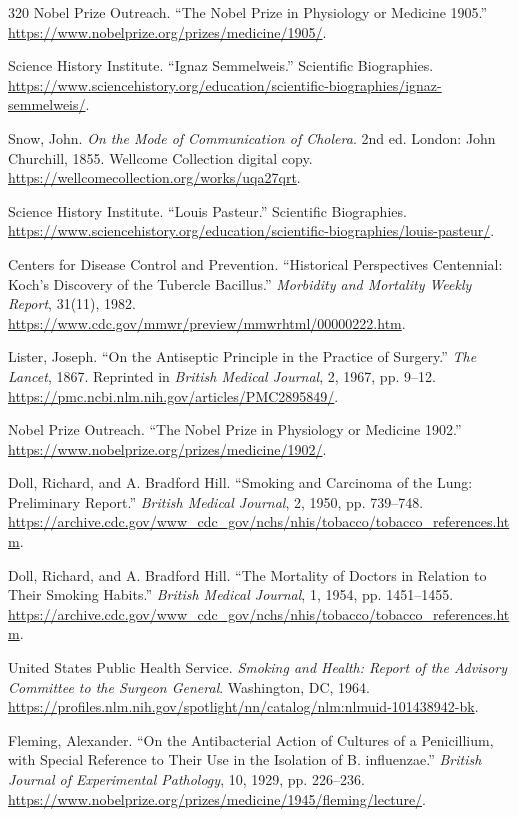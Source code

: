 \documentclass[12pt,oneside]{book}
\begin{document}
\begin{thebibliography}{320}
Nobel Prize Outreach. ``The Nobel Prize in Physiology or Medicine 1905.''
\url{https://www.nobelprize.org/prizes/medicine/1905/}.

Science History Institute. ``Ignaz Semmelweis.'' Scientific Biographies.
\url{https://www.sciencehistory.org/education/scientific-biographies/ignaz-semmelweis/}.

Snow, John. \emph{On the Mode of Communication of Cholera}. 2nd ed. London:
John Churchill, 1855. Wellcome Collection digital copy.
\url{https://wellcomecollection.org/works/uqa27qrt}.

Science History Institute. ``Louis Pasteur.'' Scientific Biographies.
\url{https://www.sciencehistory.org/education/scientific-biographies/louis-pasteur/}.

Centers for Disease Control and Prevention. ``Historical Perspectives
Centennial: Koch's Discovery of the Tubercle Bacillus.'' \emph{Morbidity and
Mortality Weekly Report}, 31(11), 1982.
\url{https://www.cdc.gov/mmwr/preview/mmwrhtml/00000222.htm}.

Lister, Joseph. ``On the Antiseptic Principle in the Practice of Surgery.''
\emph{The Lancet}, 1867. Reprinted in \emph{British Medical Journal}, 2,
1967, pp. 9--12. \url{https://pmc.ncbi.nlm.nih.gov/articles/PMC2895849/}.

Nobel Prize Outreach. ``The Nobel Prize in Physiology or Medicine 1902.''
\url{https://www.nobelprize.org/prizes/medicine/1902/}.

Doll, Richard, and A. Bradford Hill. ``Smoking and Carcinoma of the Lung:
Preliminary Report.'' \emph{British Medical Journal}, 2, 1950, pp. 739--748.
\url{https://archive.cdc.gov/www_cdc_gov/nchs/nhis/tobacco/tobacco_references.htm}.

Doll, Richard, and A. Bradford Hill. ``The Mortality of Doctors in Relation to
Their Smoking Habits.'' \emph{British Medical Journal}, 1, 1954, pp. 1451--1455.
\url{https://archive.cdc.gov/www_cdc_gov/nchs/nhis/tobacco/tobacco_references.htm}.

United States Public Health Service. \emph{Smoking and Health: Report of the
Advisory Committee to the Surgeon General}. Washington, DC, 1964.
\url{https://profiles.nlm.nih.gov/spotlight/nn/catalog/nlm:nlmuid-101438942-bk}.

Fleming, Alexander. ``On the Antibacterial Action of Cultures of a Penicillium,
with Special Reference to Their Use in the Isolation of B. influenzae.''
\emph{British Journal of Experimental Pathology}, 10, 1929, pp. 226--236.
\url{https://www.nobelprize.org/prizes/medicine/1945/fleming/lecture/}.


\end{thebibliography}
\end{document}
